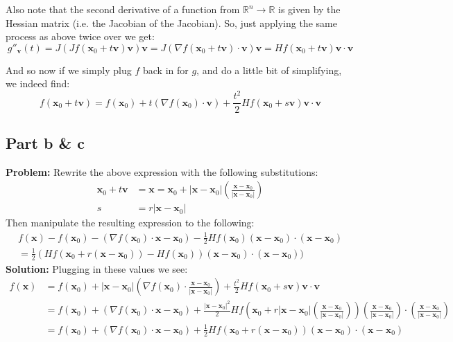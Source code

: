 \documentclass{article}
\begin{document}
Also note that the second derivative of a function from $\mathbb R^n\to\mathbb R$ is given by the Hessian matrix (i.e. the Jacobian of the Jacobian). So, just applying the same process as above twice over we get:
$$g''_\mathbf v(t)=J(Jf(\mathbf x_0+t\mathbf v)\mathbf v)\mathbf v=J(\nabla f(\mathbf x_0+t\mathbf v)\cdot\mathbf v)\mathbf v=Hf(\mathbf x_0+t\mathbf v)\mathbf v\cdot\mathbf v$$

And so now if we simply plug $f$ back in for $g$, and do a little bit of simplifying, we indeed find:
$$f(\mathbf x_0+t\mathbf v)=f(\mathbf x_0)+t(\nabla f(\mathbf x_0)\cdot\mathbf v)+\frac{t^2}{2}Hf(\mathbf x_0+s\mathbf v)\mathbf v\cdot\mathbf v$$

\subsection*{Part b \& c}
\textbf{Problem:} Rewrite the above expression with the following substitutions:
\begin{align*}
  \mathbf x_0+t\mathbf v&=\mathbf x=\mathbf x_0+|\mathbf x-\mathbf x_0|\left(\frac{\mathbf x-\mathbf x_0}{|\mathbf x-\mathbf x_0|}\right)\\
  s&=r|\mathbf x-\mathbf x_0|
\end{align*}
Then manipulate the resulting expression to the following:
\begin{align*}f(\mathbf x)-f(\mathbf x_0)-(\nabla f(\mathbf x_0)\cdot\mathbf x-\mathbf x_0)-\frac{1}{2}Hf(\mathbf x_0)(\mathbf x-\mathbf x_0)\cdot(\mathbf x-\mathbf x_0)\\
=\frac{1}{2}(Hf(\mathbf x_0+r(\mathbf x-\mathbf x_0))-Hf(\mathbf x_0))(\mathbf x-\mathbf x_0)\cdot(\mathbf x-\mathbf x_0))
\end{align*}
\textbf{Solution:} Plugging in these values we see:
\begin{align*}
  f(\mathbf x)&=f(\mathbf x_0)+|\mathbf x-\mathbf x_0|(\nabla f(\mathbf x_0)\cdot \frac{\mathbf x-\mathbf x_0}{|\mathbf x-\mathbf x_0|})+\frac{t^2}{2}Hf(\mathbf x_0+s\mathbf v)\mathbf v\cdot\mathbf v\\
  &=f(\mathbf x_0)+(\nabla f(\mathbf x_0)\cdot\mathbf x-\mathbf x_0)+\frac{|\mathbf x-\mathbf x_0|^2}{2}Hf\left(\mathbf x_0+r|\mathbf x-\mathbf x_0|\left(\frac{\mathbf x-\mathbf x_0}{|\mathbf x-\mathbf x_0|}\right)\right)\left(\frac{\mathbf x-\mathbf x_0}{|\mathbf x-\mathbf x_0|}\right)\cdot\left(\frac{\mathbf x-\mathbf x_0}{|\mathbf x-\mathbf x_0|}\right)\\
  &=f(\mathbf x_0)+(\nabla f(\mathbf x_0)\cdot\mathbf x-\mathbf x_0)+\frac{1}{2}Hf(\mathbf x_0+r(\mathbf x-\mathbf x_0))(\mathbf x-\mathbf x_0)\cdot(\mathbf x-\mathbf x_0)\\
\end{align*}
\end{document}
